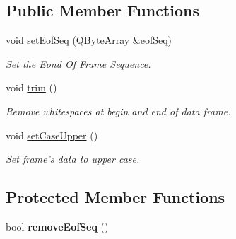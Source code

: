 \subsection*{Public Member Functions}
\begin{DoxyCompactItemize}
\item 
void \hyperlink{classmdt_frame_codec_ascii_a771d983498fb298595afbb97ee7a40f1}{setEofSeq} (QByteArray \&eofSeq)
\begin{DoxyCompactList}\small\item\em Set the Eond Of Frame Sequence. \end{DoxyCompactList}\item 
\hypertarget{classmdt_frame_codec_ascii_a0e8b9664e1451400e1b955c5180c0de8}{
void \hyperlink{classmdt_frame_codec_ascii_a0e8b9664e1451400e1b955c5180c0de8}{trim} ()}
\label{classmdt_frame_codec_ascii_a0e8b9664e1451400e1b955c5180c0de8}

\begin{DoxyCompactList}\small\item\em Remove whitespaces at begin and end of data frame. \end{DoxyCompactList}\item 
\hypertarget{classmdt_frame_codec_ascii_a119506d484a807d3486d47738ee22920}{
void \hyperlink{classmdt_frame_codec_ascii_a119506d484a807d3486d47738ee22920}{setCaseUpper} ()}
\label{classmdt_frame_codec_ascii_a119506d484a807d3486d47738ee22920}

\begin{DoxyCompactList}\small\item\em Set frame's data to upper case. \end{DoxyCompactList}\end{DoxyCompactItemize}
\subsection*{Protected Member Functions}
\begin{DoxyCompactItemize}
\item 
\hypertarget{classmdt_frame_codec_ascii_ab9aebbbadb6d40b1353634154e6a28c0}{
bool {\bfseries removeEofSeq} ()}
\label{classmdt_frame_codec_ascii_ab9aebbbadb6d40b1353634154e6a28c0}

\end{DoxyCompactItemize}
